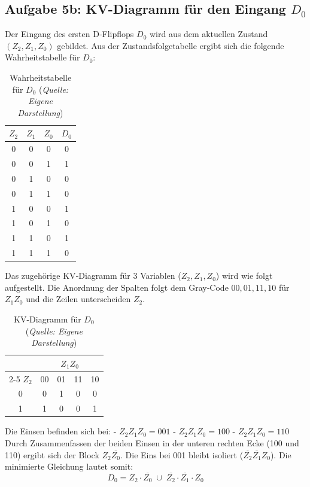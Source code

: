 \subsection{\texorpdfstring{Aufgabe 5b: KV-Diagramm für den Eingang \(D_0\)}{Aufgabe 5b: KV-Diagramm für den Eingang D0}}
Der Eingang des ersten D‑Flipflops \(D_0\) wird aus dem aktuellen Zustand \((\mathit{Z}_2, \mathit{Z}_1, \mathit{Z}_0)\) gebildet.  
Aus der Zustandsfolgetabelle ergibt sich die folgende Wahrheitstabelle für \(D_0\):
\begin{table}[h]
\centering
\begin{tabular}{c|c|c|c}
\toprule
\(Z_2\) & \(Z_1\) & \(Z_0\) & \(D_0\) \\
\midrule
0 & 0 & 0 & 0 \\
0 & 0 & 1 & 1 \\
0 & 1 & 0 & 0 \\
0 & 1 & 1 & 0 \\
1 & 0 & 0 & 1 \\
1 & 0 & 1 & 0 \\
1 & 1 & 0 & 1 \\
1 & 1 & 1 & 0 \\
\bottomrule
\end{tabular}
\caption{Wahrheitstabelle für \(D_0\) (\textit{Quelle: Eigene Darstellung})}
\label{tab:d0_wahrheit}
\end{table}
Das zugehörige KV‑Diagramm für 3 Variablen (\textit{\(Z_2, Z_1, Z_0\)}) wird wie folgt aufgestellt.  
Die Anordnung der Spalten folgt dem Gray‑Code \(00, 01, 11, 10\) für \(Z_1 Z_0\) und die Zeilen unterscheiden \(Z_2\).
\begin{table}[h]
\centering
\begin{tabular}{c|cccc}
\multicolumn{1}{c}{} & \multicolumn{4}{c}{\(Z_1 Z_0\)} \\
\cline{2-5}
\(Z_2\) & 00 & 01 & 11 & 10 \\
\hline
0 & 0 & 1 & 0 & 0 \\
1 & 1 & 0 & 0 & 1 \\
\hline
\end{tabular}
\caption{KV-Diagramm für \(D_0\) (\textit{Quelle: Eigene Darstellung})}
\label{tab:d0_kv}
\end{table}
Die Einsen befinden sich bei:
- \(Z_2 Z_1 Z_0 = 001\)
- \(Z_2 Z_1 Z_0 = 100\)
- \(Z_2 Z_1 Z_0 = 110\)
Durch Zusammenfassen der beiden Einsen in der unteren rechten Ecke (100 und 110) ergibt sich der Block \(Z_2 \overline{Z_0}\).  
Die Eins bei 001 bleibt isoliert (\textit{\( \overline{Z_2} \overline{Z_1} Z_0 \)}).
Die minimierte Gleichung lautet somit: \hspace{4cm} \[\boxed{D_0 = Z_2 \cdot \overline{Z_0} \;\cup\; \overline{Z_2} \cdot \overline{Z_1} \cdot Z_0}\]
